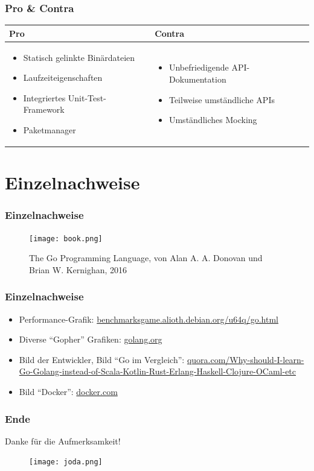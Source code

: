 \documentclass{beamer}
\begin{document}
\begin{frame}
\frametitle{Pro \& Contra}

\begin{tabular}{p{5cm} | p{5.5cm}}
\textbf{Pro} & \textbf{Contra} \\ \hline
\begin{itemize}
\setlength{\itemsep}{20pt}
\item Statisch gelinkte Binärdateien
\item Laufzeiteigenschaften
\item Integriertes Unit-Test-Framework
\item Paketmanager
\end{itemize}
&
\begin{itemize}
\setlength{\itemsep}{20pt}
\item Unbefriedigende API-Dokumentation
\item Teilweise umständliche APIs
\item Umst\"andliches Mocking
\end{itemize}
\\
\end{tabular}

\end{frame}

\section{Einzelnachweise}
\begin{frame}
\frametitle{Einzelnachweise}

\begin{figure}
\texttt{[image: book.png]}
\caption{The Go Programming Language, von Alan A. A. Donovan und Brian W. Kernighan, 2016}
\end{figure}

\end{frame}

\begin{frame}
\frametitle{Einzelnachweise}

\begin{itemize}
\setlength{\itemsep}{20pt}
\item Performance-Grafik: \href{https://benchmarksgame.alioth.debian.org/u64q/go.htmll}{benchmarksgame.alioth.debian.org/u64q/go.html}
\item Diverse ``Gopher'' Grafiken: \href{https://golang.org/}{golang.org}
\item Bild der Entwickler, Bild ``Go im Vergleich'': \href{https://www.quora.com/Why-should-I-learn-Go-Golang-instead-of-Scala-Kotlin-Rust-Erlang-Haskell-Clojure-OCaml-etc}{quora.com/Why-should-I-learn-Go-Golang-instead-of-Scala-Kotlin-Rust-Erlang-Haskell-Clojure-OCaml-etc}
\item Bild ``Docker'': \href{https://www.docker.com/}{docker.com}
\end{itemize}

\end{frame}

\begin{frame}
\frametitle{Ende}

\centering
Danke f\"ur die Aufmerksamkeit!

\begin{figure}
\texttt{[image: joda.png]}
\end{figure}

\end{frame}
\end{document}
